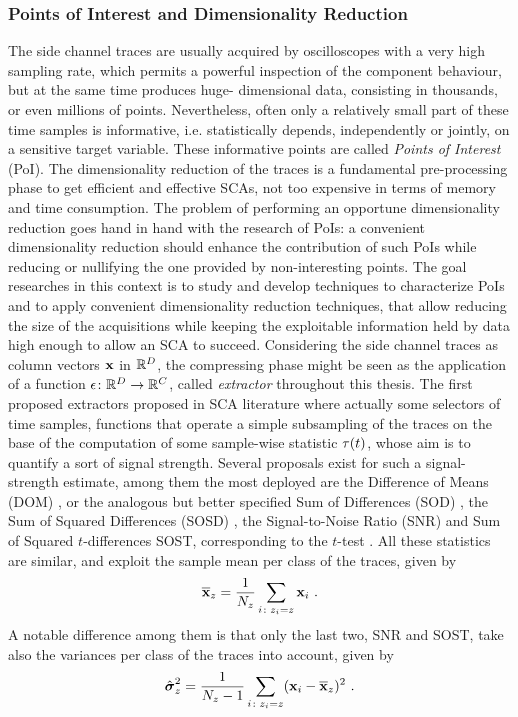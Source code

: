 \subsubsection{Points of Interest and Dimensionality Reduction}\label{sec:extractors}
The side channel traces are usually acquired by oscilloscopes with a very high sampling rate, which permits a powerful inspection of the component behaviour, but at the same time produces huge- dimensional data, consisting in thousands, or even millions of points. Nevertheless, often only a relatively small part of these time samples is informative, i.e. statistically depends, independently or jointly, on a sensitive target variable. These informative points are called \emph{Points of Interest} (PoI). The dimensionality reduction of the traces is a fundamental pre-processing phase to get efficient and effective SCAs, not too expensive in terms of memory and time consumption. The problem of performing an opportune dimensionality reduction goes hand in hand with the research of PoIs: a convenient dimensionality reduction should enhance the contribution of such PoIs while reducing or nullifying the one provided by non-interesting points. 
The goal researches in this context is to study and develop techniques to characterize PoIs and to apply convenient dimensionality reduction techniques, that allow reducing the size of the acquisitions while keeping the exploitable information held by data high enough to allow an SCA to succeed.
Considering the side channel traces as column vectors ${\bf x}$ in $\mathbb{R}^D$, the compressing phase might be seen as the application of a function $\epsilon\colon \mathbb{R}^D\rightarrow \mathbb{R}^C$, called {\em extractor} throughout this thesis. The first proposed extractors proposed in SCA literature where actually some selectors of time samples, \ie functions that operate a simple subsampling of the traces on the base of the computation of some sample-wise statistic $\tau(t)$, whose aim is to quantify a sort of  signal strength. Several proposals exist for such a signal-strength estimate, among them the most deployed are the Difference of Means (DOM) \cite{Chari2003}, or the analogous but better specified Sum of Differences (SOD) \cite{Rechberger2005}, the Sum of Squared Differences (SOSD) \cite{gierlichs2006templates}, the Signal-to-Noise Ratio (SNR) \cite{mangard2008power,lomne2013behind} and  Sum of Squared $t$-differences SOST, corresponding to the $t$-test \cite{gierlichs2006templates}. All these statistics are similar, and exploit the sample mean per class of the traces, given by
\begin{equation}
\overline{\textbf{x}}_{z} = \frac{1}{N_{z}}\sum_{i\colon z_i=z} \textbf{x}_i \mbox{ .}
\end{equation} 
A notable difference among them is that only the last two, SNR and SOST, take also the variances per class of the traces into account, given by
\begin{equation}
\hat{\boldsymbol{\sigma}}^2_{z} = \frac{1}{N_{z}-1}\sum_{i\colon z_i=z} (\textbf{x}_i - \overline{\textbf{x}}_{z})^2 \mbox{ .}
\end{equation}

